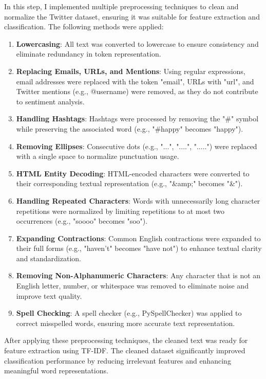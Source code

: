 \documentclass[12pt]{fphw}
\begin{document}
In this step, I implemented multiple preprocessing techniques to clean and normalize the Twitter dataset, ensuring it was suitable for feature extraction and classification. The following methods were applied:
\begin{enumerate}
    \item \textbf{Lowercasing}: All text was converted to lowercase to ensure consistency and eliminate redundancy in token representation.
    \item \textbf{Replacing Emails, URLs, and Mentions}: Using regular expressions, email addresses were replaced with the token "email", URLs with "url", and Twitter mentions (e.g., @username) were removed, as they do not contribute to sentiment analysis.
    \item \textbf{Handling Hashtags}: Hashtags were processed by removing the "\#" symbol while preserving the associated word (e.g., "\#happy" becomes "happy").
    \item \textbf{Removing Ellipses}: Consecutive dots (e.g., "...", "....", ".....") were replaced with a single space to normalize punctuation usage.
    \item \textbf{HTML Entity Decoding}: HTML-encoded characters were converted to their corresponding textual representation (e.g., "\&amp;" becomes "\&").
    \item \textbf{Handling Repeated Characters}: Words with unnecessarily long character repetitions were normalized by limiting repetitions to at most two occurrences (e.g., "soooo" becomes "soo").
    \item \textbf{Expanding Contractions}: Common English contractions were expanded to their full forms (e.g., "haven't" becomes "have not") to enhance textual clarity and standardization.
    \item \textbf{Removing Non-Alphanumeric Characters}: Any character that is not an English letter, number, or whitespace was removed to eliminate noise and improve text quality.
    \item \textbf{Spell Checking}: A spell checker (e.g., PySpellChecker) was applied to correct misspelled words, ensuring more accurate text representation.
\end{enumerate}

After applying these preprocessing techniques, the cleaned text was ready for feature extraction using TF-IDF. The cleaned dataset significantly improved classification performance by reducing irrelevant features and enhancing meaningful word representations.{\newline}
\end{document}
